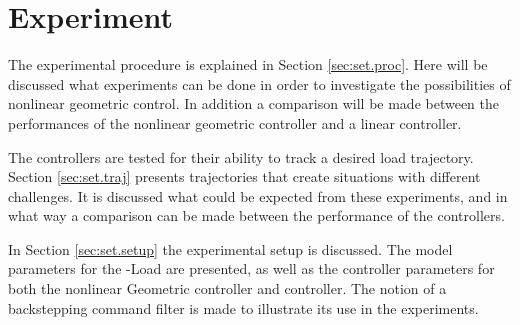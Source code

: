 \chapter{Experiment}\label{ch:setup}
The experimental procedure is explained in Section \ref{sec:set.proc}. 
Here will be discussed what experiments can be done in order to investigate the possibilities of nonlinear geometric control.
In addition a comparison will be made between the performances of the nonlinear geometric controller and a linear  controller.

The controllers are tested for their ability to track a desired load trajectory. 
Section \ref{sec:set.traj} presents trajectories that create situations with different challenges.
It is discussed what could be expected from these experiments, and in what way a comparison can be made between the performance of the controllers.

In Section \ref{sec:set.setup} the experimental setup is discussed. 
The model parameters for the -Load are presented, as well as the controller parameters for both the nonlinear Geometric controller and  controller.
The notion of a backstepping command filter is made to illustrate its use in the experiments.


